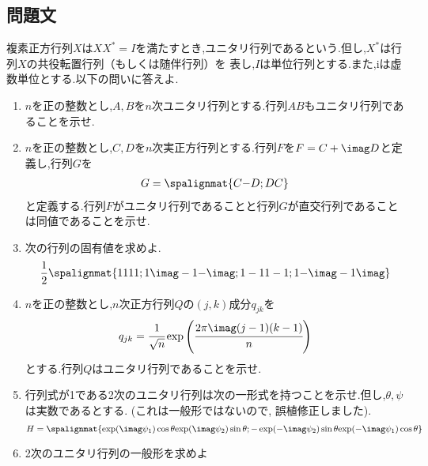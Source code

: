 \subsection{問題文}
複素正方行列$X$は$XX^{\ast}=I$を満たすとき,ユニタリ行列であるという.但し,$X^{\ast}$は行列$X$の共役転置行列（もしくは随伴行列）を
表し,$I$は単位行列とする.また,iは虚数単位とする.以下の問いに答えよ.
\begin{enumerate}[(1)]
    \setlength{\itemsep}{10pt}
    \item $n$を正の整数とし,$A, B$を$n$次ユニタリ行列とする.行列$AB$もユニタリ行列であることを示せ.
    \item $n$を正の整数とし,$C, D$を$n$次実正方行列とする.行列$F$を$F = C + \imag D$と定義し,行列$G$を
    \begin{align*}
        G = \spalignmat{
            C {-D};
            D {C}
        }
    \end{align*}
    と定義する.行列$F$がユニタリ行列であることと行列$G$が直交行列であることは同値であることを示せ.
    \item 次の行列の固有値を求めよ.
    \begin{align*}
        \frac{1}{2}\spalignmat{
            1 1 1 1;
            1 {\imag} -1 {-\imag};
            1 -1 1 -1;
            1 {-\imag} -1 {\imag}
        }
    \end{align*}
    \item $n$を正の整数とし,$n$次正方行列$Q$の$(j, k)$成分$q_{jk}$を
    \begin{equation*}
        q_{jk} = \cfrac{1}{\sqrt{n}}\exp \left(\cfrac{2\pi\imag (j - 1)(k - 1)}{n}\right)
    \end{equation*}
    とする.行列$Q$はユニタリ行列であることを示せ.
    \item 行列式が1である2次のユニタリ行列は次の一形式を持つことを示せ.但し,$\theta, \psi$は実数であるとする. (これは一般形ではないので, 誤植修正しました).
    \begin{equation*}
        H = \spalignmat{
            {\exp(\imag \psi_{1})\cos\theta} {\exp(\imag \psi_{2})\sin\theta};
            {-\exp(-\imag \psi_{2})\sin\theta} {\exp(-\imag \psi_{1})\cos\theta}
        }
    \end{equation*}
    \item 2次のユニタリ行列の一般形を求めよ
\end{enumerate}

\newpage

